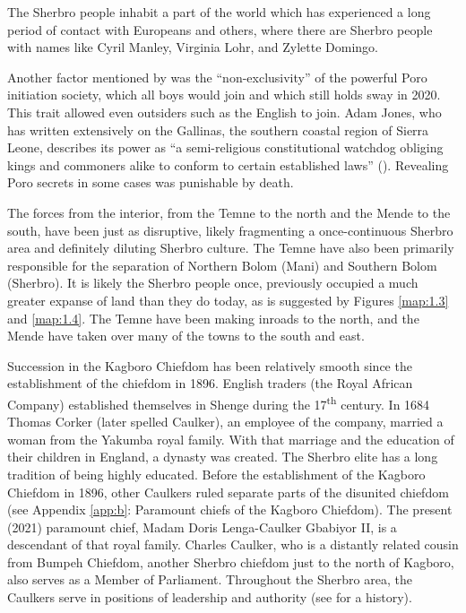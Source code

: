 The Sherbro people inhabit a part of the world which has experienced a long period of contact with Europeans and others, where there are Sherbro people with names like Cyril Manley, Virginia Lohr, and Zylette Domingo.

Another factor mentioned by \citet{Day1983} was the “non-exclusivity” of the powerful Poro initiation society, which all boys would join and which still holds sway in 2020. This trait allowed even outsiders such as the English to join. Adam Jones, who has written extensively on the Gallinas, the southern coastal region of Sierra Leone, describes its power as “a semi-religious constitutional watchdog obliging kings and commoners alike to conform to certain established laws” (\citealt[19]{Jones1983}). Revealing Poro secrets in some cases was punishable by death.

The forces from the interior, from the Temne to the north and the Mende to the south, have been just as disruptive, likely fragmenting a once-continuous Sherbro area and definitely diluting Sherbro culture. The Temne have also been primarily responsible for the separation of Northern Bolom (Mani) and Southern Bolom (Sherbro). It is likely the Sherbro people once, previously occupied a much greater expanse of land than they do today, as is suggested by Figures \ref{map:1.3} and \ref{map:1.4}. The Temne have been making inroads to the north, and the Mende have taken over many of the towns to the south and east.

Succession in the Kagboro Chiefdom has been relatively smooth since the establishment of the chiefdom in 1896. English traders (the Royal African Company) established themselves in Shenge during the 17\textsuperscript{th} century.  {In 1684} Thomas Corker (later spelled Caulker), an employee of the company, married a woman from the Yakumba royal family. With that marriage and the education of their children in England, a dynasty was created. The Sherbro elite has a long tradition of being highly educated. Before the establishment of the Kagboro Chiefdom in 1896, other Caulkers ruled separate parts of the disunited chiefdom (see Appendix \ref{app:b}: Paramount chiefs of the Kagboro Chiefdom). The present (2021) paramount chief, Madam Doris Lenga-Caulker Gbabiyor II, is a descendant of that royal family. Charles Caulker, who is a distantly related cousin from Bumpeh Chiefdom, another Sherbro chiefdom just to the north of Kagboro, also serves as a Member of Parliament. Throughout the Sherbro area, the Caulkers serve in positions of leadership and authority (see \citealt{Caulker-Burnett2010} for a history).

